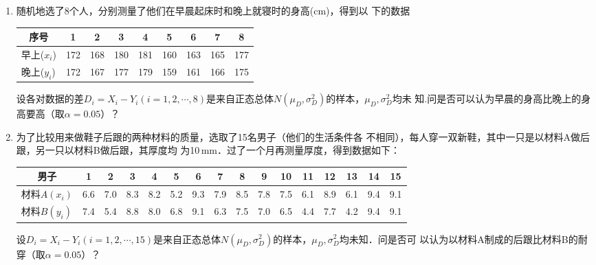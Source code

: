 \documentclass[10pt,a4paper]{article}
\begin{document}
\begin{enumerate}
    \item 随机地选了8个人，分别测量了他们在早晨起床时和晚上就寝时的身高(cm)，得到以
    下的数据
    \renewcommand{\arraystretch}{1.3}
    \begin{table}[H]\centering
        \begin{tabular}{c|cccccccc}
        \hline
        序号                             & 1                       & 2                       & 3                       & 4   & 5   & 6   & 7   & 8   \\ \hline
        早上($x_i$)                      & 172                     & 168                     & 180                     & 181 & 160 & 163 & 165 & 177 \\ \hline
        \multicolumn{1}{l|}{晚上($y_i$)} & \multicolumn{1}{l}{172} & \multicolumn{1}{l}{167} & \multicolumn{1}{l}{177} & 179 & 159 & 161 & 166 & 175 \\ \hline
        \end{tabular}
    \end{table}
    \renewcommand{\arraystretch}{1.0}
    设各对数据的差$D_i=X_i-Y_i(i=1,2,\cdots,8)$是来自正态总体$N(\mu_D,\sigma^2_D)$的样本，$\mu_D,\sigma^2_D$均未
    知.问是否可以认为早晨的身高比晚上的身高要高（取$\alpha=0.05$）？




    \item 为了比较用来做鞋子后跟的两种材料的质量，选取了15名男子（他们的生活条件各
    不相同），每人穿一双新鞋，其中一只是以材料A做后跟，另一只以材料B做后跟，其厚度均
    为10$\, $mm．过了一个月再测量厚度，得到数据如下：
    \renewcommand{\arraystretch}{1.3}
    \begin{table}[H]\centering
        \begin{tabular}{c|ccccccccccccccc}
        \hline
        男子                              & 1                       & 2                       & 3                       & 4   & 5   & 6   & 7   & 8   & 9   & 10  & 11  & 12  & 13  & 14  & 15  \\ \hline
        材料$A(x_i)$                      & 6.6                     & 7.0                     & 8.3                     & 8.2 & 5.2 & 9.3 & 7.9 & 8.5 & 7.8 & 7.5 & 6.1 & 8.9 & 6.1 & 9.4 & 9.1 \\ \hline
        \multicolumn{1}{l|}{材料$B(y_i)$} & \multicolumn{1}{l}{7.4} & \multicolumn{1}{l}{5.4} & \multicolumn{1}{l}{8.8} & 8.0 & 6.8 & 9.1 & 6.3 & 7.5 & 7.0 & 6.5 & 4.4 & 7.7 & 4.2 & 9.4 & 9.1 \\ \hline
        \end{tabular}
    \end{table}
    \renewcommand{\arraystretch}{1.0}
    设$D_i=X_i-Y_i(i=1,2,\cdots,15)$是来自正态总体$N(\mu_D,\sigma^2_D)$的样本，$\mu_D,\sigma^2_D$均未知．问是否可
    以认为以材料A制成的后跟比材料B的耐穿（取$\alpha=0.05$）？





\end{enumerate}
\end{document}
